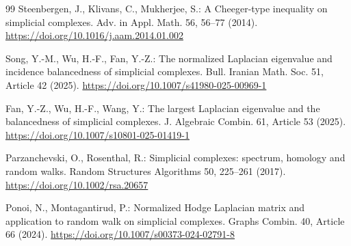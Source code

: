 \documentclass[12pt]{article}
\theoremstyle{remark}
\begin{document}
\begin{thebibliography}{99}
Steenbergen, J., Klivans, C., Mukherjee, S.:
A Cheeger-type inequality on simplicial complexes.
Adv. in Appl. Math. 56, 56--77 (2014).
\url{https://doi.org/10.1016/j.aam.2014.01.002}

Song, Y.-M., Wu, H.-F., Fan, Y.-Z.:
The normalized Laplacian eigenvalue and incidence balancedness of simplicial complexes.
Bull. Iranian Math. Soc. 51, Article 42 (2025).
\url{https://doi.org/10.1007/s41980-025-00969-1}

Fan, Y.-Z., Wu, H.-F., Wang, Y.:
The largest Laplacian eigenvalue and the balancedness of simplicial complexes.
J. Algebraic Combin. 61, Article 53 (2025).
\url{https://doi.org/10.1007/s10801-025-01419-1}

Parzanchevski, O., Rosenthal, R.:
Simplicial complexes: spectrum, homology and random walks.
Random Structures Algorithms 50, 225--261 (2017).
\url{https://doi.org/10.1002/rsa.20657}

Ponoi, N., Montagantirud, P.:
Normalized Hodge Laplacian matrix and application to random walk on simplicial complexes.
Graphs Combin. 40, Article 66 (2024).
\url{https://doi.org/10.1007/s00373-024-02791-8}

\end{thebibliography}
\end{document}
